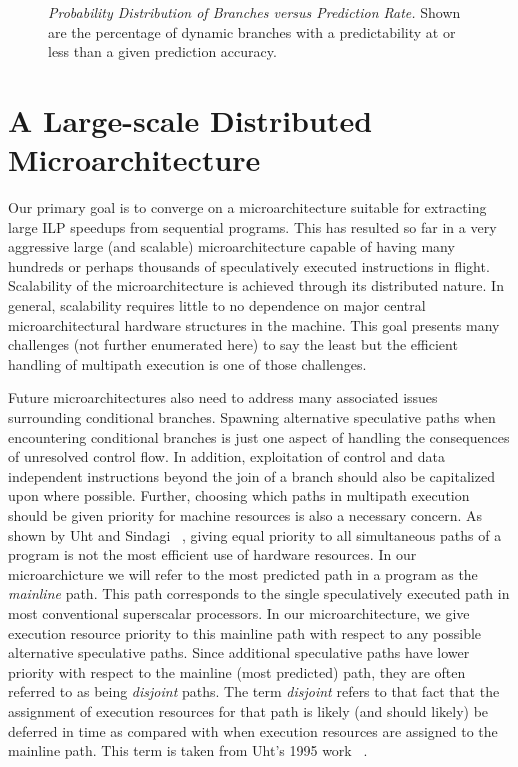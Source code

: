 \documentclass[10pt,dvips]{article}
\begin{document}
\begin{figure}
\vspace{0.2 in}
\setlength{\epsfxsize}{10cm}%
\centerline{}
\caption{{\em Probability Distribution of Branches versus Prediction Rate.} 
Shown are the percentage of dynamic
branches with a predictability at or less than a given prediction
accuracy.}
\label{fig:bpdist}
\end{figure}
%
\section{A Large-scale Distributed Microarchitecture}
%
Our primary goal is to converge on a microarchitecture suitable
for extracting large ILP speedups from sequential programs.
This has resulted so far in a very aggressive large (and scalable)
microarchitecture capable of having many hundreds or perhaps thousands
of speculatively executed instructions in flight.  Scalability
of the microarchitecture is achieved through its distributed nature.
In general, scalability requires little to no dependence on major
central microarchitectural hardware structures in the machine.
This goal presents many challenges (not further enumerated here)
to say the least but the efficient handling of multipath execution
is one of those challenges.  

Future microarchitectures also need to 
address many associated issues surrounding conditional branches.
Spawning alternative speculative paths when encountering conditional
branches is just one aspect of handling the consequences of
unresolved control flow.
In addition, exploitation
of control
and data independent instructions beyond the join of a branch should
also be capitalized upon where possible.
Further, choosing which paths in multipath execution should
be given priority for machine resources is also a necessary concern.
As shown by Uht and Sindagi ~\cite{Uht95},
giving equal priority to all simultaneous paths
of a program is not the most efficient use of hardware resources.
In our microarchicture we will refer to the most predicted path
in a program as the 
\textit{mainline} path.  
This path corresponds to the single speculatively
executed path in most conventional superscalar processors.
In our microarchitecture,
we give execution resource priority to this mainline path with respect
to any possible alternative speculative paths.  
Since additional speculative paths have lower priority with
respect to the mainline (most predicted) path, they are often referred
to as being
\textit{disjoint} paths.  
The term \textit{disjoint} refers to that fact that the assignment
of execution resources for that path is likely (and should likely) be
deferred in time
as compared with when execution resources are assigned to the mainline
path.
This term is taken from Uht's 
1995 work ~\cite{Uht95}.
\end{document}
